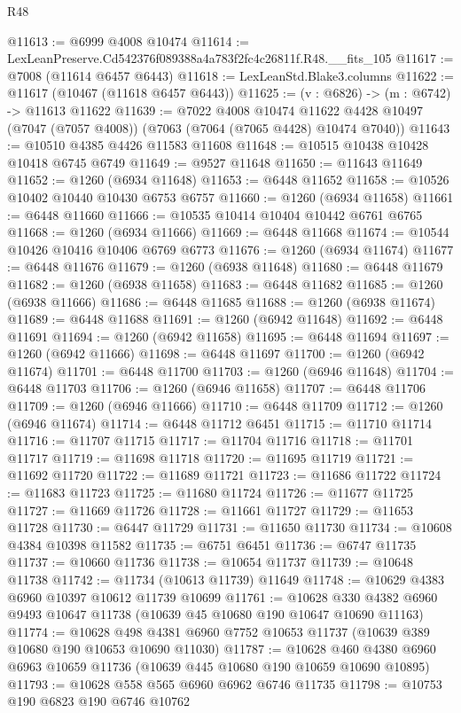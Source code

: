 \begin{lexlean}{R48}
\begin{coremodule}
@11613 := @6999 @4008 @10474
@11614 := LexLeanPreserve.Cd542376f089388a4a783f2fc4c26811f.R48.__fits_105
@11617 := @7008 (@11614 @6457 @6443)
@11618 := LexLeanStd.Blake3.columns
@11622 := @11617 (@10467 (@11618 @6457 @6443))
@11625 := (v : @6826) -> (m : @6742) -> @11613 @11622
@11639 := @7022
    @4008
    @10474
    @11622
    @4428
    @10497
    (@7047 (@7057 @4008))
    (@7063 (@7064 (@7065 @4428) @10474 @7040))
@11643 := @10510 @4385 @4426 @11583 @11608
@11648 := @10515 @10438 @10428 @10418 @6745 @6749
@11649 := @9527 @11648
@11650 := @11643 @11649
@11652 := @1260 (@6934 @11648)
@11653 := @6448 @11652
@11658 := @10526 @10402 @10440 @10430 @6753 @6757
@11660 := @1260 (@6934 @11658)
@11661 := @6448 @11660
@11666 := @10535 @10414 @10404 @10442 @6761 @6765
@11668 := @1260 (@6934 @11666)
@11669 := @6448 @11668
@11674 := @10544 @10426 @10416 @10406 @6769 @6773
@11676 := @1260 (@6934 @11674)
@11677 := @6448 @11676
@11679 := @1260 (@6938 @11648)
@11680 := @6448 @11679
@11682 := @1260 (@6938 @11658)
@11683 := @6448 @11682
@11685 := @1260 (@6938 @11666)
@11686 := @6448 @11685
@11688 := @1260 (@6938 @11674)
@11689 := @6448 @11688
@11691 := @1260 (@6942 @11648)
@11692 := @6448 @11691
@11694 := @1260 (@6942 @11658)
@11695 := @6448 @11694
@11697 := @1260 (@6942 @11666)
@11698 := @6448 @11697
@11700 := @1260 (@6942 @11674)
@11701 := @6448 @11700
@11703 := @1260 (@6946 @11648)
@11704 := @6448 @11703
@11706 := @1260 (@6946 @11658)
@11707 := @6448 @11706
@11709 := @1260 (@6946 @11666)
@11710 := @6448 @11709
@11712 := @1260 (@6946 @11674)
@11714 := @6448 @11712 @6451
@11715 := @11710 @11714
@11716 := @11707 @11715
@11717 := @11704 @11716
@11718 := @11701 @11717
@11719 := @11698 @11718
@11720 := @11695 @11719
@11721 := @11692 @11720
@11722 := @11689 @11721
@11723 := @11686 @11722
@11724 := @11683 @11723
@11725 := @11680 @11724
@11726 := @11677 @11725
@11727 := @11669 @11726
@11728 := @11661 @11727
@11729 := @11653 @11728
@11730 := @6447 @11729
@11731 := @11650 @11730
@11734 := @10608 @4384 @10398 @11582
@11735 := @6751 @6451
@11736 := @6747 @11735
@11737 := @10660 @11736
@11738 := @10654 @11737
@11739 := @10648 @11738
@11742 := @11734 (@10613 @11739) @11649
@11748 := @10629 @4383 @6960 @10397 @10612 @11739 @10699
@11761 := @10628 @330 @4382 @6960 @9493 @10647 @11738 (@10639 @45 @10680 @190 @10647 @10690 @11163)
@11774 := @10628 @498 @4381 @6960 @7752 @10653 @11737 (@10639 @389 @10680 @190 @10653 @10690 @11030)
@11787 := @10628 @460 @4380 @6960 @6963 @10659 @11736 (@10639 @445 @10680 @190 @10659 @10690 @10895)
@11793 := @10628 @558 @565 @6960 @6962 @6746 @11735
@11798 := @10753 @190 @6823 @190 @6746 @10762

\end{coremodule}
\end{lexlean}
